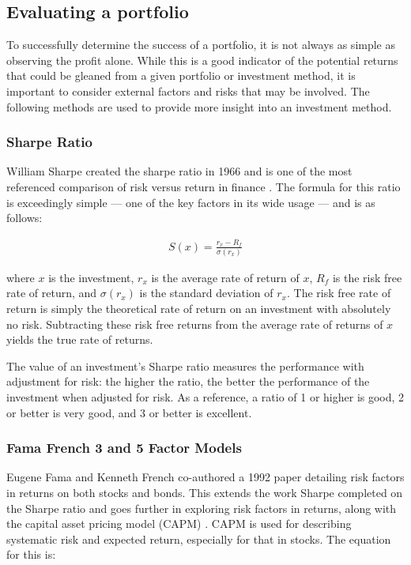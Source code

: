 \subsection{Evaluating a portfolio}
To successfully determine the success of a portfolio, it is not always as simple as observing the profit alone. While this is a good indicator of the potential returns that could be gleaned from a given portfolio or investment method, it is important to consider external factors and risks that may be involved. The following methods are used to provide more insight into an investment method.

\subsubsection{Sharpe Ratio}
\label{ssub:sharpe-ratio}
William Sharpe created the sharpe ratio in 1966 and is one of the most referenced comparison of risk versus return in finance \parencite{sharpe-ratio}. The formula for this ratio is exceedingly simple --- one of the key factors in its wide usage --- and is as follows:

\begin{align*}
S(x) = \frac{r_x - R_f}{\sigma(r_x)}
\end{align*}

\noindent
where $x$ is the investment, $r_x$ is the average rate of return of $x$, $R_f$ is the risk free rate of return, and $\sigma(r_x)$ is the standard deviation of $r_x$. The risk free rate of return is simply the theoretical rate of return on an investment with absolutely no risk. Subtracting these risk free returns from the average rate of returns of $x$ yields the true rate of returns.

The value of an investment's Sharpe ratio measures the performance with adjustment for risk: the higher the ratio, the better the performance of the investment when adjusted for risk. As a reference, a ratio of 1 or higher is good, 2 or better is very good, and 3 or better is excellent. 

\subsubsection{Fama French 3 and 5 Factor Models}
\label{ssub:fama-french}
Eugene Fama and Kenneth French co-authored a 1992 paper detailing risk factors in returns on both stocks and bonds. This extends the work Sharpe completed on the Sharpe ratio and goes further in exploring risk factors in returns, along with the capital asset pricing model (CAPM) \parencite{ff3}. CAPM is used for describing systematic risk and expected return, especially for that in stocks. The equation for this is:

